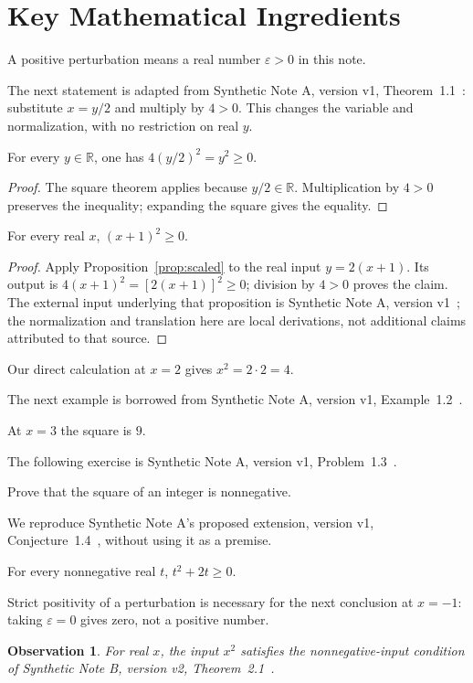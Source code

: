 \documentclass[12pt,reqno]{amsart}
\newtheorem{observation}[theorem]{Observation}
\begin{document}
\section{Key Mathematical Ingredients}
\begin{definition}\label{def:perturbation}
A positive perturbation means a real number $\varepsilon>0$ in this note.
\end{definition}
The next statement is adapted from Synthetic Note A, version v1,
Theorem~1.1~\cite[Theorem~1.1]{note-a}: substitute $x=y/2$ and multiply by
$4>0$. This changes the variable and normalization, with no restriction on
real $y$.
\begin{proposition}\label{prop:scaled}
For every $y\in\mathbb R$, one has $4(y/2)^2=y^2\geq0$.
\end{proposition}
\begin{proof}
The square theorem applies because $y/2\in\mathbb R$. Multiplication by
$4>0$ preserves the inequality; expanding the square gives the equality.
\end{proof}
\begin{lemma}\label{lem:local}
For every real $x$, $(x+1)^2\geq0$.
\end{lemma}
\begin{proof}
Apply Proposition~\ref{prop:scaled} to the real input $y=2(x+1)$.
Its output is $4(x+1)^2=[2(x+1)]^2\geq0$; division by $4>0$ proves the claim.
The external input underlying that proposition is Synthetic Note A,
version v1~\cite[Theorem~1.1]{note-a}; the normalization and translation here
are local derivations, not additional claims attributed to that source.
\end{proof}
\begin{example}\label{ex:local}
Our direct calculation at $x=2$ gives $x^2=2\cdot2=4$.
\end{example}
The next example is borrowed from Synthetic Note A, version v1,
Example~1.2~\cite[Example~1.2]{note-a}.
\begin{example}\label{ex:borrowed}
At $x=3$ the square is $9$.
\end{example}
The following exercise is Synthetic Note A, version v1,
Problem~1.3~\cite[Problem~1.3]{note-a}.
\begin{problem}\label{prob:square}
Prove that the square of an integer is nonnegative.
\end{problem}
We reproduce Synthetic Note A's proposed extension, version v1,
Conjecture~1.4~\cite[Conjecture~1.4]{note-a}, without using it as a premise.
\begin{conjecture}\label{conj:extension}
For every nonnegative real $t$, $t^2+2t\geq0$.
\end{conjecture}
\begin{remark}\label{rem:boundary}
Strict positivity of a perturbation is necessary for the next conclusion
at $x=-1$: taking $\varepsilon=0$ gives zero, not a positive number.
\end{remark}
\begin{observation}\label{obs:input}
For real $x$, the input $x^2$ satisfies the nonnegative-input condition of
Synthetic Note B, version v2, Theorem~2.1~\cite[Theorem~2.1]{note-b}.
\end{observation}
\end{document}
